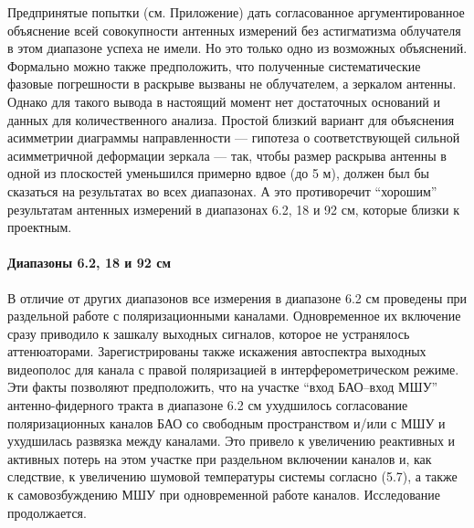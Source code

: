 Предпринятые попытки (см. Приложение) дать согласованное аргументированное объяснение всей
совокупности антенных измерений без астигматизма облучателя в этом диапазоне успеха не имели. Но это
только одно из возможных объяснений. Формально можно также предположить, что полученные
систематические фазовые погрешности в раскрыве вызваны не облучателем, а зеркалом антенны. Однако
для такого вывода в настоящий момент нет достаточных оснований и данных для количественного анализа.
Простой близкий вариант для объяснения асимметрии диаграммы направленности --- гипотеза о
соответствующей сильной асимметричной деформации зеркала --- так, чтобы размер раскрыва антенны в
одной из плоскостей уменьшился примерно вдвое (до 5 м), должен был бы сказаться на результатах во
всех диапазонах. А это противоречит ``хорошим'' результатам антенных измерений в диапазонах 6.2, 18
и 92 см, которые близки к проектным.

\paragraph{Диапазоны 6.2, 18 и 92 см}

В отличие от других диапазонов все измерения в диапазоне 6.2 см проведены при раздельной работе с
поляризационными каналами. Одновременное их включение сразу приводило к зашкалу выходных сигналов,
которое не устранялось аттенюаторами. Зарегистрированы также искажения автоспектра выходных
видеополос для канала с правой поляризацией в интерферометрическом режиме. Эти факты позволяют
предположить, что на участке ``вход БАО--вход МШУ'' антенно-фидерного тракта в диапазоне 6.2 см
ухудшилось согласование поляризационных каналов БАО со свободным пространством и/или с МШУ и
ухудшилась развязка между каналами. Это привело к увеличению реактивных и активных потерь на этом
участке при раздельном включении каналов и, как следствие, к увеличению шумовой температуры системы
согласно (5.7), а также к самовозбуждению МШУ при одновременной работе каналов. Исследование
продолжается.

